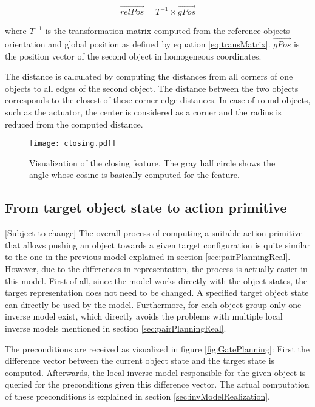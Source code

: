 \begin{equation}
	\vec{relPos} = T^{-1} \times \vec{gPos}
\label{eq:trans}
\end{equation}

where $T^{-1}$ is the transformation matrix computed from the reference objects orientation and global position as defined by equation \ref{eq:transMatrix}. $\vec{gPos}$ is the position vector of the second object in homogeneous coordinates. 

The distance is calculated by computing the distances from all corners of one objects to all edges of the second object. 
The distance between the two objects corresponds to the closest of these corner-edge distances. In case of round objects, such as the actuator, the center is considered as a corner and the radius is reduced from the computed distance.

\begin{figure}
	\centering
	\texttt{[image: closing.pdf]}
	\caption{Visualization of the closing feature. The gray half circle shows the angle whose cosine is basically computed for the feature.} 
	\label{fig:closing}
\end{figure}

\subsection{From target object state to action primitive \label{sec:gatePlanningReal}}
[Subject to change]
The overall process of computing a suitable action primitive that allows pushing an object towards a given target configuration is quite similar to the one in the previous model explained in section \ref{sec:pairPlanningReal}. However, due to the differences in representation, the process is actually easier in this model. 
First of all, since the model works directly with the object states, the target representation does not need to be changed. A specified target object state can directly be used by the model. 
Furthermore, for each object group only one inverse model exist, which directly avoids the problems with multiple local inverse models mentioned in section \ref{sec:pairPlanningReal}. 

The preconditions are received as visualized in figure \ref{fig:GatePlanning}: 
First the difference vector between the current object state and the target state is computed. Afterwards, the local inverse model responsible for the given object is queried for the preconditions given this difference vector. The actual computation of these preconditions is explained in section \ref{sec:invModelRealization}.

